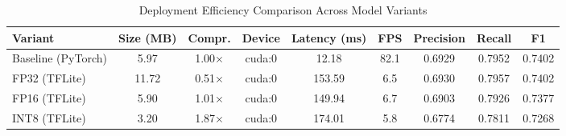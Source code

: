 \documentclass{article}
\begin{document}
\begin{table}[htbp]
  \centering
  \caption{Deployment Efficiency Comparison Across Model Variants}
  \label{tab:deployment_efficiency}
  \small
  \begin{tabular}{lcccccccc}
    \toprule
    \textbf{Variant} & \textbf{Size (MB)} & \textbf{Compr.} & \textbf{Device} & \textbf{Latency (ms)} & \textbf{FPS} & \textbf{Precision} & \textbf{Recall} & \textbf{F1} \\
    \midrule
    Baseline (PyTorch) & 5.97 & 1.00$\times$ & cuda:0 & 12.18 & 82.1 & 0.6929 & 0.7952 & 0.7402 \\
    FP32 (TFLite) & 11.72 & 0.51$\times$ & cuda:0 & 153.59 & 6.5 & 0.6930 & 0.7957 & 0.7402 \\
    FP16 (TFLite) & 5.90 & 1.01$\times$ & cuda:0 & 149.94 & 6.7 & 0.6903 & 0.7926 & 0.7377 \\
    INT8 (TFLite) & 3.20 & 1.87$\times$ & cuda:0 & 174.01 & 5.8 & 0.6774 & 0.7811 & 0.7268 \\
    \bottomrule
  \end{tabular}
\end{table}
\end{document}
